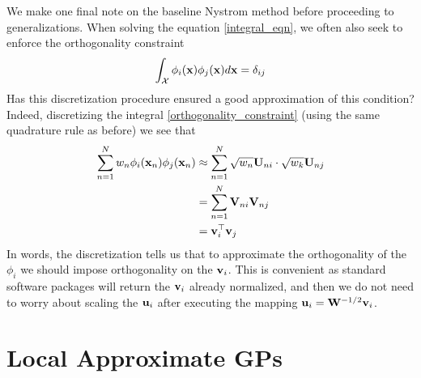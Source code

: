 \documentclass[12pt]{article}
\begin{document}
We make one final note on the baseline Nystrom method before proceeding to generalizations. When solving the equation \ref{integral_eqn}, we often also seek to enforce the 
orthogonality constraint 
\begin{align}
\int_{\mathcal{X}} \phi_i(\mathbf{x}) \phi_j(\mathbf{x}) d\mathbf{x} = \delta_{ij} \label{orthogonality_constraint}
\end{align}
Has this discretization procedure ensured a good approximation of this condition? Indeed, discretizing the integral \ref{orthogonality_constraint} (using the 
same quadrature rule as before) we see that
\begin{align*}
\sum_{n = 1}^{N} w_{n} \phi_i(\mathbf{x}_{n}) \phi_j(\mathbf{x}_{n}) &\approx \sum_{n = 1}^{N} \sqrt{w_{n}} \mathbf{U}_{n i}\cdot \sqrt{w_k} \mathbf{U}_{n j}\\
								   &=  \sum_{n = 1}^{N} \mathbf{V}_{n i} \mathbf{V}_{n j} \\
								   &= \mathbf{v}_i^{\top} \mathbf{v}_j
\end{align*}
In words, the discretization tells us that to approximate the orthogonality of the $\phi_i$ we should impose orthogonality on the $\mathbf{v}_i$. This
is convenient as standard software packages will return the $\mathbf{v}_i$ already normalized, and then we do not need to worry about scaling the 
$\mathbf{u}_i$ after executing the mapping $\mathbf{u}_i = \mathbf{W}^{-1/2}\mathbf{v}_i$.   




\section{Local Approximate GPs}
\end{document}
